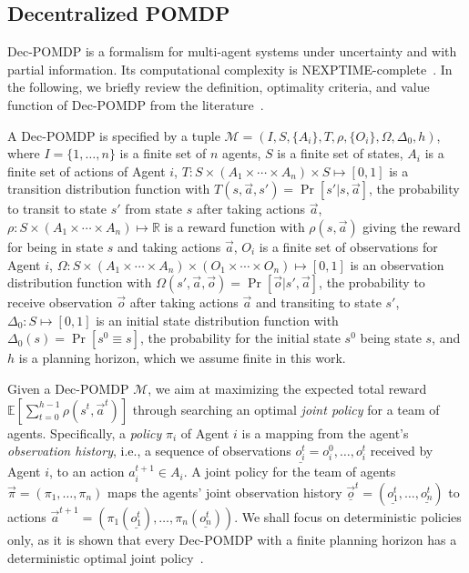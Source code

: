 \subsection{Decentralized POMDP}
\label{sect:dssat-dec-pomdp}
Dec-POMDP is a formalism for multi-agent systems under uncertainty and with partial information.
Its computational complexity is NEXPTIME-complete~\cite{Bernstein2002}.
In the following, we briefly review the definition, optimality criteria,
and value function of Dec-POMDP from the literature~\cite{Oliehoek2016}.

A Dec-POMDP is specified by a tuple $\mathcal{M}=(I,S,\{A_i\},T,\rho,\{O_i\},\Omega,\Delta_0,h)$, where
$I=\{1,\ldots,n\}$ is a finite set of $n$ agents,
$S$ is a finite set of states,
$A_i$ is a finite set of actions of Agent $i$,
$T:S\times(A_1\times\cdots\times A_n)\times S\mapsto [0,1]$ is a transition distribution function with
$T(s,\Vec{a},s')=\Pr[s'|s,\vec{a}]$,
the probability to transit to state $s'$ from state $s$ after taking actions $\vec{a}$,
$\rho:S\times(A_1\times\cdots\times A_n)\mapsto\mathbb{R}$ is a reward function with
$\rho(s,\vec{a})$ giving the reward for being in state $s$ and taking actions $\vec{a}$,
$O_i$ is a finite set of observations for Agent $i$,
$\Omega:S\times(A_1\times\cdots\times A_n)\times(O_1\times\cdots\times O_n)\mapsto[0,1]$ is an observation distribution function with
$\Omega(s',\Vec{a},\vec{o})=\Pr[\vec{o}|s',\vec{a}]$,
the probability to receive observation $\vec{o}$ after taking actions $\vec{a}$ and transiting to state $s'$, $\Delta_0:S\mapsto [0,1]$ is an initial state distribution function with $\Delta_0(s)=\Pr[s^0 \equiv s]$,
the probability for the initial state $s^0$ being state $s$,
and $h$ is a planning horizon, which we assume finite in this work.

Given a Dec-POMDP $\mathcal{M}$,
we aim at maximizing the expected total reward $\mathbb{E}[\sum_{t=0}^{h-1}\rho(s^t,\vec{a}^t)]$ through searching an optimal \textit{joint policy} for a team of agents.
Specifically, a \textit{policy} $\pi_i$ of Agent $i$ is a mapping from the agent's \textit{observation history},
i.e., a sequence of observations $\underline{o_i^t}=o_i^0,\ldots,o_i^t$ received by Agent $i$,
to an action $a_i^{t+1}\in A_i$.
A joint policy for the team of agents $\vec{\pi}=(\pi_1,\ldots,\pi_n)$ maps the agents' joint observation history $\vec{\underline{o}}^t=(\underline{o_1^t},\ldots,\underline{o_n^t})$ to actions $\vec{a}^{t+1}=(\pi_1(\underline{o_1^t}),\ldots,\pi_n(\underline{o_n^t}))$.
We shall focus on deterministic policies only,
as it is shown that every Dec-POMDP with a finite planning horizon has a deterministic optimal joint policy~\cite{Oliehoek2008}.

